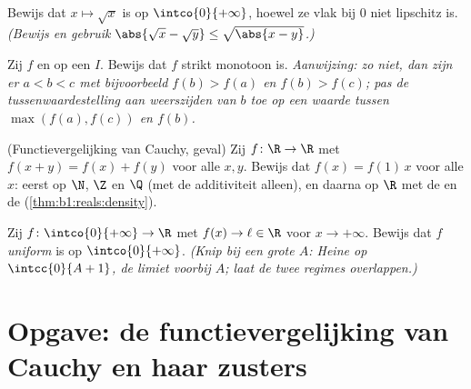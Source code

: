 \begin{exercise}[$\star\star$]\label{exo:b1:continuity:9}
Bewijs dat $x \mapsto \sqrt x$  is op $\intco{0}{+\infty}$,
hoewel ze vlak bij $0$ niet lipschitz is. \emph{(Bewijs en gebruik
$\abs{\sqrt x - \sqrt y} \leq \sqrt{\abs{x - y}}$.)}
\end{exercise}

\begin{exercise}[$\star\star\star$]\label{exo:b1:continuity:10}
Zij $f$  en  op een  $I$. Bewijs dat $f$ strikt
monotoon is. \emph{Aanwijzing: zo niet, dan zijn er $a < b < c$ met
bijvoorbeeld $f(b) > f(a)$ en $f(b) > f(c)$; pas de tussenwaardestelling
aan weerszijden van $b$ toe op een waarde tussen $\max(f(a), f(c))$ en
$f(b)$.}
\end{exercise}

\begin{exercise}[$\star\star\star$]\label{exo:b1:continuity:11}
(Functievergelijking van Cauchy,  geval) Zij $f \colon \R \to \R$
 met $f(x + y) = f(x) + f(y)$ voor alle $x, y$. Bewijs dat $f(x) =
f(1)\,x$ voor alle $x$: eerst op $\N$, $\Z$ en $\Q$ (met de additiviteit
alleen), en daarna op $\R$ met de  en de 
(\cref{thm:b1:reals:density}).
\end{exercise}

\begin{exercise}[$\star\star\star$]\label{exo:b1:continuity:12}
Zij $f \colon \intco{0}{+\infty} \to \R$  met $f(x) \to \ell \in
\R$ voor $x \to +\infty$. Bewijs dat $f$ \emph{uniform}  is op
$\intco{0}{+\infty}$. \emph{(Knip bij een grote $A$: Heine op
$\intcc{0}{A+1}$, de limiet voorbij $A$; laat de twee regimes
overlappen.)}
\end{exercise}

\section{Opgave: de functievergelijking van Cauchy en haar zusters}

